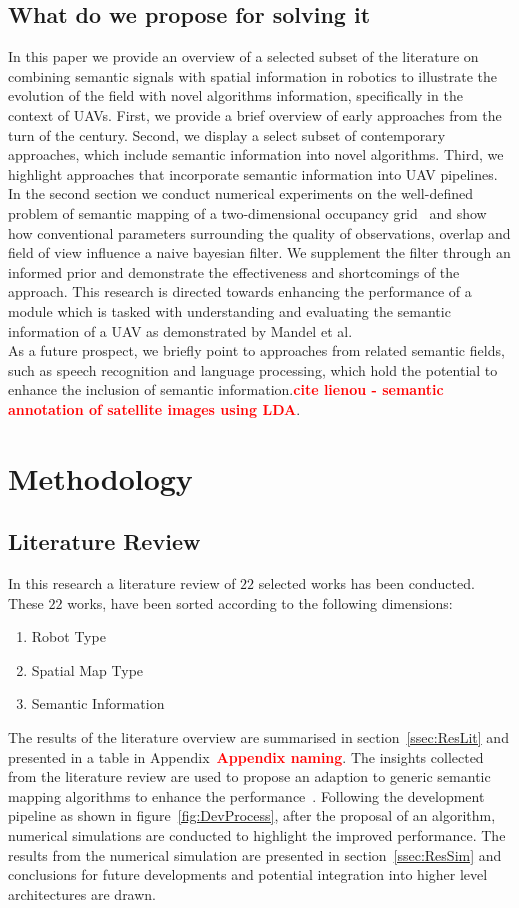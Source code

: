 \documentclass[twocolumn,letterpaper]{IEEEAerospaceCLS}  %
\newcommand\todo[1]{\textbf{\textcolor{red}{#1}}}
\begin{document}
\subsection{What do we propose for solving it}
In this paper we provide an overview of a selected subset of the literature on combining semantic signals with spatial information in robotics to illustrate the evolution of the field with novel algorithms information, specifically in the context of UAVs. First, we provide a brief overview of early approaches from the turn of the century. Second, we display a select subset of contemporary approaches, which include semantic information into novel algorithms. Third, we highlight approaches that incorporate semantic information into UAV pipelines.\\
In the second section we conduct numerical experiments on the well-defined problem of semantic mapping of a two-dimensional occupancy grid~\cite{gonzalez_unmanned_2016} and show how conventional parameters surrounding the quality of observations, overlap and field of view influence a naive bayesian filter. We supplement the filter through an informed prior and demonstrate the effectiveness and shortcomings of the approach. This research is directed towards enhancing the performance of a module which is tasked with understanding and evaluating the semantic information of a UAV as demonstrated by Mandel et al.~\cite{mandel_towards_2020}\\
As a future prospect, we briefly point to approaches from related semantic fields, such as speech recognition and language processing, which hold the potential to enhance the inclusion of semantic information.\todo{cite lienou - semantic annotation of satellite images using LDA}.

\section{Methodology} \label{sec:Met}
\subsection{Literature Review} \label{ssec:MetLit}
In this research a literature review of $22$ selected works has been conducted. These $22$ works, have been sorted according to the following dimensions:
\begin{enumerate}
    \item Robot Type
    \item Spatial Map Type
    \item Semantic Information
\end{enumerate}
The results of the literature overview are summarised in section~\ref{ssec:ResLit} and presented in a table in Appendix~\todo{Appendix naming}. The insights collected from the literature review are used to propose an adaption to generic semantic mapping algorithms to enhance the performance~\cite{kostavelis_semantic_2015}. Following the development pipeline as shown in figure~\ref{fig:DevProcess}, after the proposal of an algorithm, numerical simulations are conducted to highlight the improved performance. The results from the numerical simulation are presented in section~\ref{ssec:ResSim} and conclusions for future developments and potential integration into higher level architectures are drawn.
\end{document}
